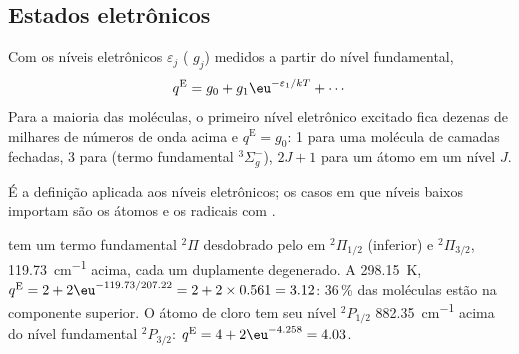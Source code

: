 \subsection*{Estados eletrônicos}

\begin{proposition}\label{prop:b3:partition-functions:q-elec}
Com os níveis eletrônicos $\varepsilon_j$ ( $g_j$) medidos a partir do nível
fundamental,
\[
  q^{\mathrm E} = g_0 + g_1\eu^{-\varepsilon_1/kT} + \cdots
\]
Para a maioria das moléculas, o primeiro nível eletrônico excitado fica dezenas de
milhares de números de onda acima e $q^{\mathrm E} = g_0$: 1 para uma molécula de camadas fechadas, 3 para
 (termo fundamental ${}^3\Sigma_g^-$), $2J + 1$ para um átomo em um nível $J$.
\end{proposition}

É a definição aplicada aos níveis eletrônicos; os casos em que níveis baixos
importam são os átomos e os radicais com .

\begin{example}\label{ex:b3:partition-functions:no-cl}
 tem um termo fundamental ${}^2\Pi$ desdobrado pelo  em ${}^2\Pi_{1/2}$ (inferior)
e ${}^2\Pi_{3/2}$, \qty{119.73}{cm^{-1}} acima, cada um duplamente degenerado. A \qty{298.15}{K},
$q^{\mathrm E} = 2 + 2\eu^{-119.73/207.22} = 2 + 2\times0.561 = 3.12$: 36\,\% das moléculas estão na
componente superior. O átomo de cloro tem seu nível ${}^2P_{1/2}$ \qty{882.35}{cm^{-1}}
acima do nível fundamental ${}^2P_{3/2}$: $q^{\mathrm E} = 4 + 2\eu^{-4.258} = 4.03$.
\end{example}

